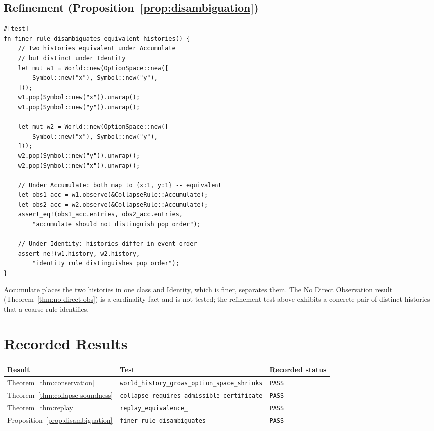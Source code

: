 \documentclass[12pt,oneside,openany]{book}
\theoremstyle{spherepop}
\theoremstyle{remarkstyle}
\begin{document}
\subsection*{Refinement (Proposition~\ref{prop:disambiguation})}
\begin{lstlisting}
#[test]
fn finer_rule_disambiguates_equivalent_histories() {
    // Two histories equivalent under Accumulate
    // but distinct under Identity
    let mut w1 = World::new(OptionSpace::new([
        Symbol::new("x"), Symbol::new("y"),
    ]));
    w1.pop(Symbol::new("x")).unwrap();
    w1.pop(Symbol::new("y")).unwrap();

    let mut w2 = World::new(OptionSpace::new([
        Symbol::new("x"), Symbol::new("y"),
    ]));
    w2.pop(Symbol::new("y")).unwrap();
    w2.pop(Symbol::new("x")).unwrap();

    // Under Accumulate: both map to {x:1, y:1} -- equivalent
    let obs1_acc = w1.observe(&CollapseRule::Accumulate);
    let obs2_acc = w2.observe(&CollapseRule::Accumulate);
    assert_eq!(obs1_acc.entries, obs2_acc.entries,
        "accumulate should not distinguish pop order");

    // Under Identity: histories differ in event order
    assert_ne!(w1.history, w2.history,
        "identity rule distinguishes pop order");
}
\end{lstlisting}

Accumulate places the two histories in one class and Identity, which is finer, separates them. The No Direct Observation result (Theorem~\ref{thm:no-direct-obs}) is a cardinality fact and is not tested; the refinement test above exhibits a concrete pair of distinct histories that a coarse rule identifies.

\section{Recorded Results}

\begin{center}
\small
\begin{tabular}{p{}p{}p{}}
\toprule
Result & Test & Recorded status \\
\midrule
Theorem~\ref{thm:conservation} & \texttt{world\_\allowbreak history\_\allowbreak grows\_\allowbreak option\_\allowbreak space\_\allowbreak shrinks} & \texttt{PASS} \\
Theorem~\ref{thm:collapse-soundness} & \texttt{collapse\_\allowbreak requires\_\allowbreak admissible\_\allowbreak certificate} & \texttt{PASS} \\
Theorem~\ref{thm:replay} & \texttt{replay\_\allowbreak equivalence\_\allowbreak *} & \texttt{PASS} \\
Proposition~\ref{prop:disambiguation} & \texttt{finer\_\allowbreak rule\_\allowbreak disambiguates} & \texttt{PASS} \\
\bottomrule
\end{tabular}
\end{center}
\end{document}
